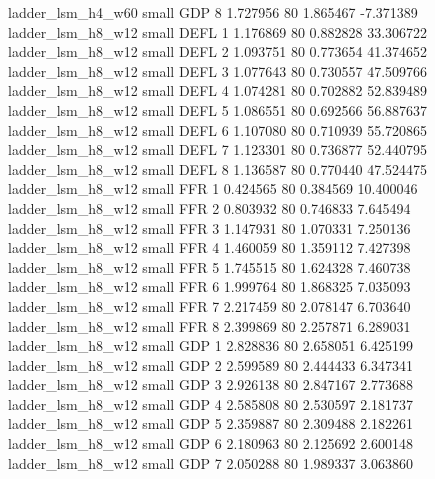        ladder_lsm_h4_w60      small      GDP                 8 1.727956 80       1.865467          -7.371389
       ladder_lsm_h8_w12      small     DEFL                 1 1.176869 80       0.882828          33.306722
       ladder_lsm_h8_w12      small     DEFL                 2 1.093751 80       0.773654          41.374652
       ladder_lsm_h8_w12      small     DEFL                 3 1.077643 80       0.730557          47.509766
       ladder_lsm_h8_w12      small     DEFL                 4 1.074281 80       0.702882          52.839489
       ladder_lsm_h8_w12      small     DEFL                 5 1.086551 80       0.692566          56.887637
       ladder_lsm_h8_w12      small     DEFL                 6 1.107080 80       0.710939          55.720865
       ladder_lsm_h8_w12      small     DEFL                 7 1.123301 80       0.736877          52.440795
       ladder_lsm_h8_w12      small     DEFL                 8 1.136587 80       0.770440          47.524475
       ladder_lsm_h8_w12      small      FFR                 1 0.424565 80       0.384569          10.400046
       ladder_lsm_h8_w12      small      FFR                 2 0.803932 80       0.746833           7.645494
       ladder_lsm_h8_w12      small      FFR                 3 1.147931 80       1.070331           7.250136
       ladder_lsm_h8_w12      small      FFR                 4 1.460059 80       1.359112           7.427398
       ladder_lsm_h8_w12      small      FFR                 5 1.745515 80       1.624328           7.460738
       ladder_lsm_h8_w12      small      FFR                 6 1.999764 80       1.868325           7.035093
       ladder_lsm_h8_w12      small      FFR                 7 2.217459 80       2.078147           6.703640
       ladder_lsm_h8_w12      small      FFR                 8 2.399869 80       2.257871           6.289031
       ladder_lsm_h8_w12      small      GDP                 1 2.828836 80       2.658051           6.425199
       ladder_lsm_h8_w12      small      GDP                 2 2.599589 80       2.444433           6.347341
       ladder_lsm_h8_w12      small      GDP                 3 2.926138 80       2.847167           2.773688
       ladder_lsm_h8_w12      small      GDP                 4 2.585808 80       2.530597           2.181737
       ladder_lsm_h8_w12      small      GDP                 5 2.359887 80       2.309488           2.182261
       ladder_lsm_h8_w12      small      GDP                 6 2.180963 80       2.125692           2.600148
       ladder_lsm_h8_w12      small      GDP                 7 2.050288 80       1.989337           3.063860
